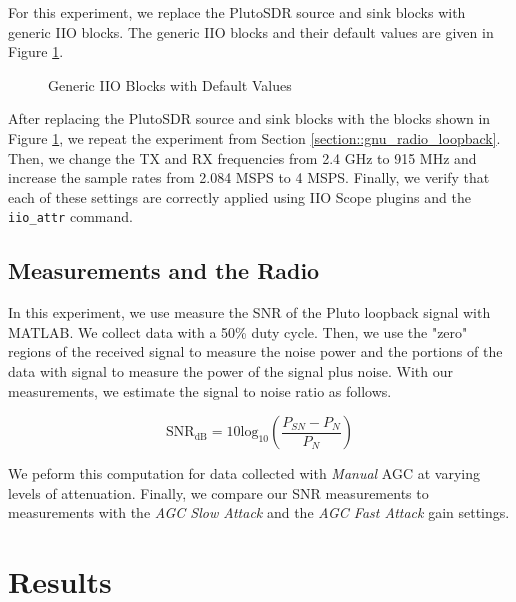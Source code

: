 \documentclass{article}
\begin{document}
For this experiment, we replace the PlutoSDR source and sink blocks with generic IIO blocks. The generic IIO blocks and their default values are given in Figure \ref{fig::generic_iio_blocks}.

\begin{figure}[H]
	\centerline{}
	\caption{Generic IIO Blocks with Default Values}
	\label{fig::generic_iio_blocks}
\end{figure}

After replacing the PlutoSDR source and sink blocks with the blocks shown in Figure \ref{fig::generic_iio_blocks}, we repeat the experiment from Section \ref{section::gnu_radio_loopback}. Then, we change the TX and RX frequencies from 2.4 GHz to 915 MHz and increase the sample rates from 2.084 MSPS to 4 MSPS. Finally, we verify that each of these settings are correctly applied using IIO Scope plugins and the \texttt{iio\_attr} command. 

\subsection{Measurements and the Radio}
\label{section::snr_measurement}

In this experiment, we use measure the SNR of the Pluto loopback signal with MATLAB. We collect data with a 50\% duty cycle. Then, we use the "zero" regions of the received signal to measure the noise power and the portions of the data with signal to measure the power of the signal plus noise. With our measurements, we estimate the signal to noise ratio as follows.

\begin{equation}
	\text{SNR}_\text{dB} = 10\text{log}_{10}\left(\frac{P_{SN} - P_{N}}{P_{N}}\right)
	\label{eq::snr_estimate}
\end{equation}

We peform this computation for data collected with \textit{Manual} AGC at varying levels of attenuation. Finally, we compare our SNR measurements to measurements with the \textit{AGC Slow Attack} and the \textit{AGC Fast Attack} gain settings.

\section{Results}
\end{document}
